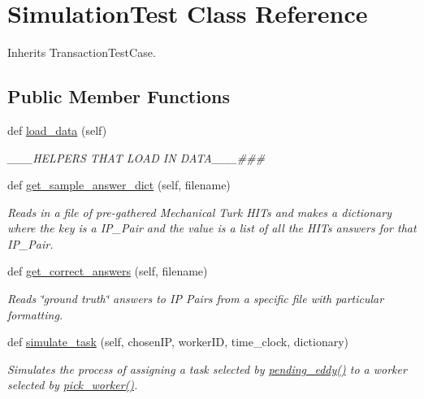 \hypertarget{classdynamicfilterapp_1_1test__simulations_1_1_simulation_test}{}\section{Simulation\+Test Class Reference}
\label{classdynamicfilterapp_1_1test__simulations_1_1_simulation_test}


Inherits Transaction\+Test\+Case.

\subsection*{Public Member Functions}
\begin{DoxyCompactItemize}
\item 
def \mbox{\hyperlink{classdynamicfilterapp_1_1test__simulations_1_1_simulation_test_a3e78e589cce2f0b893a227e23c51a87b}{load\+\_\+data}} (self)
\begin{DoxyCompactList}\small\item\em \+\_\+\+\_\+\+\_\+\+H\+E\+L\+P\+E\+RS T\+H\+AT L\+O\+AD IN D\+A\+T\+A\+\_\+\+\_\+\+\_\+\#\#\# \end{DoxyCompactList}\item 
def \mbox{\hyperlink{classdynamicfilterapp_1_1test__simulations_1_1_simulation_test_a26c189c92a01e0126ac7de29f350cc52}{get\+\_\+sample\+\_\+answer\+\_\+dict}} (self, filename)
\begin{DoxyCompactList}\small\item\em Reads in a file of pre-\/gathered Mechanical Turk H\+I\+Ts and makes a dictionary where the key is a I\+P\+\_\+\+Pair and the value is a list of all the H\+I\+Ts answers for that I\+P\+\_\+\+Pair. \end{DoxyCompactList}\item 
def \mbox{\hyperlink{classdynamicfilterapp_1_1test__simulations_1_1_simulation_test_a395b393866987a38160e3a44d9958d92}{get\+\_\+correct\+\_\+answers}} (self, filename)
\begin{DoxyCompactList}\small\item\em Reads \char`\"{}ground truth\char`\"{} answers to IP Pairs from a specific file with particular formatting. \end{DoxyCompactList}\item 
def \mbox{\hyperlink{classdynamicfilterapp_1_1test__simulations_1_1_simulation_test_a99876860db527a8dd4dbc844f453e572}{simulate\+\_\+task}} (self, chosen\+IP, worker\+ID, time\+\_\+clock, dictionary)
\begin{DoxyCompactList}\small\item\em Simulates the process of assigning a task selected by \mbox{\hyperlink{namespacedynamicfilterapp_1_1views__helpers_a997e8cb3795ce79c24f95bec20063b13}{pending\+\_\+eddy()}} to a worker selected by \mbox{\hyperlink{classdynamicfilterapp_1_1test__simulations_1_1_simulation_test_acb17139f8e2f7a4b835ec1c05400e8c2}{pick\+\_\+worker()}}. \end{DoxyCompactList}\item 

\end{DoxyCompactItemize}
